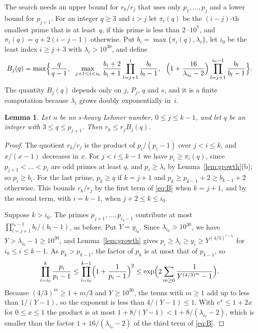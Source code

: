 \documentclass[11pt,reqno]{amsart}
\numberwithin{equation}{section}
\theoremstyle{plain}
\newtheorem{lemma}[theorem]{Lemma}
\theoremstyle{definition}
\theoremstyle{remark}
\begin{document}
The search needs an upper bound for $r_k/r_j$ that uses only
$p_1,\dots,p_j$ and a lower bound for $p_{j+1}$. For an integer
$q\ge3$ and $i>j$ let $\pi_i(q)$ be the $(i-j)$-th smallest prime that
is at least~$q$, if this prime is less than $2\cdot10^7$, and
$\pi_i(q)=q+2(i-j-1)$ otherwise. Put
$b_i=\max\{\pi_i(q),\lambda_i\}$, let $i_0$ be the least index
$i\ge j+3$ with $\lambda_i>10^{30}$, and define
\begin{equation}\label{eq:B}
  B_j(q)=\max\Bigl\{\frac{q}{q-1},\ \
  \max_{j+1\le i<i_0}\,\frac{b_i+2}{b_i+1}\prod_{l=j+1}^{i}
  \frac{b_l}{b_l-1},\ \
  \Bigl(1+\frac{16}{\lambda_{i_0}-2}\Bigr)\prod_{l=j+1}^{i_0-1}
  \frac{b_l}{b_l-1}\Bigr\}.
\end{equation}
The quantity $B_j(q)$ depends only on $j$, $P_j$, $q$ and $s$, and it
is a finite computation because $\lambda_i$ grows doubly exponentially
in~$i$.

\begin{lemma}\label{lem:ext}
Let $n$ be an $s$-heavy Lehmer number, $0\le j\le k-1$, and let $q$ be
an integer with $3\le q\le p_{j+1}$. Then $r_k\le r_jB_j(q)$.
\end{lemma}

\begin{proof}
The quotient $r_k/r_j$ is the product of $p_i/(p_i-1)$ over
$j<i\le k$, and $x/(x-1)$ decreases in $x$. For $j<i\le k-1$ we have
$p_i\ge\pi_i(q)$, since $p_{j+1}<\dots<p_i$ are odd primes at least
$q$, and $p_i\ge\lambda_i$ by Lemma~\ref{lem:growth}(b); so
$p_i\ge b_i$. For the last prime, $p_k\ge q$ if $k=j+1$ and
$p_k\ge p_{k-1}+2\ge b_{k-1}+2$ otherwise. This bounds $r_k/r_j$ by
the first term of \eqref{eq:B} when $k=j+1$, and by the second term,
with $i=k-1$, when $j+2\le k\le i_0$.

Suppose $k>i_0$. The primes $p_{j+1},\dots,p_{i_0-1}$ contribute at
most $\prod_{l=j+1}^{i_0-1}b_l/(b_l-1)$, as before. Put $Y=y_{i_0}$. Since
$\lambda_{i_0}>10^{30}$, we have $Y>\lambda_{i_0}-1\ge10^{30}$, and
Lemma~\ref{lem:growth} gives
$p_i\ge\lambda_i\ge y_i\ge Y^{(4/3)^{i-i_0}}$ for $i_0\le i\le k-1$.
As $p_k>p_{k-1}$, the factor of $p_k$ is at most that of $p_{k-1}$,
so
\[
  \prod_{i=i_0}^{k}\frac{p_i}{p_i-1}
  \le\prod_{i=i_0}^{k-1}\Bigl(1+\frac1{p_i-1}\Bigr)^{2}
  \le\exp\Bigl(2\sum_{m\ge0}\frac1{Y^{(4/3)^m}-1}\Bigr).
\]
Because $(4/3)^m\ge1+m/3$ and $Y\ge10^{30}$, the terms with $m\ge1$
add up to less than $1/(Y-1)$, so the exponent is less than
$4/(Y-1)\le1$. With $e^x\le1+2x$ for $0\le x\le1$ the product is at
most $1+8/(Y-1)<1+8/(\lambda_{i_0}-2)$, which is smaller than the
factor $1+16/(\lambda_{i_0}-2)$ of the third term of \eqref{eq:B}.
\end{proof}
\end{document}
